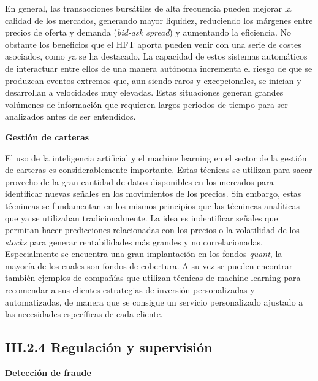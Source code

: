 \documentclass[]{DissertateUSU}
\begin{document}
\setlength\parskip{5ex}

\noindent En general, las transacciones bursátiles de alta frecuencia
pueden mejorar la calidad de los mercados, generando mayor liquidez,
reduciendo los márgenes entre precios de oferta y demanda (\emph{bid-ask
spread}) y aumentando la eficiencia. No obstante los beneficios que el
HFT aporta pueden venir con una serie de costes asociados, como ya se ha
destacado. La capacidad de estos sistemas automáticos de interactuar
entre ellos de una manera autónoma incrementa el riesgo de que se
produzcan eventos extremos que, aun siendo raros y excepcionales, se
inician y desarrollan a velocidades muy elevadas. Estas situaciones
generan grandes volúmenes de información que requieren largos periodos
de tiempo para ser analizados antes de ser entendidos.

\setlength\parskip{5ex}

\textbf{Gestión de carteras}

\noindent El uso de la inteligencia artificial y el machine learning en
el sector de la gestión de carteras es considerablemente importante.
Estas técnicas se utilizan para sacar provecho de la gran cantidad de
datos disponibles en los mercados para identificar nuevas señales en los
movimientos de los precios. Sin embargo, estas técnincas se fundamentan
en los mismos principios que las técnincas analíticas que ya se
utilizaban tradicionalmente. La idea es indentificar señales que
permitan hacer predicciones relacionadas con los precios o la
volatilidad de los \emph{stocks} para generar rentabilidades más grandes
y no correlacionadas. Especialmente se encuentra una gran implantación
en los fondos \emph{quant}, la mayoría de los cuales son fondos de
cobertura. A su vez se pueden encontrar también ejemplos de compañías
que utilizan técnicas de machine learning para recomendar a sus clientes
estrategias de inversión personalizadas y automatizadas, de manera que
se consigue un servicio personalizado ajustado a las necesidades
específicas de cada cliente.

\FloatBarrier
{}
\fancyfoot[C]{\thepage}

\subsection{III.2.4 \textbf{Regulación y supervisión}}

\justifying

\textbf{Detección de fraude}
\end{document}
